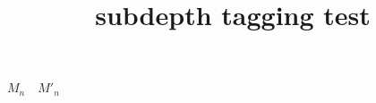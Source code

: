 \documentclass{article}
\title{subdepth tagging test}
\begin{document}
$M_n\quad M'_n$
\end{document}
